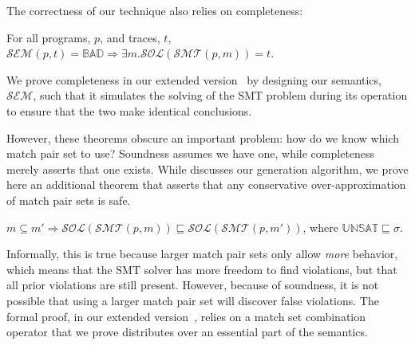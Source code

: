The correctness of our technique also relies on completeness:

\begin{theorem}[Completeness]
For all programs, $p$, and traces, $t$, $\mathcal{SEM}(p, t) =
\mathbb{BAD} \Rightarrow \exists m . \mathcal{SOL}(\mathcal{SMT}(p,
m)) = t$.
\end{theorem}

We prove completeness in our extended version~\cite{extended-version}
by designing our semantics, $\mathcal{SEM}$, such that it simulates
the solving of the SMT problem during its operation to ensure that the
two make identical conclusions.

However, these theorems obscure an important problem: how do we know
which match pair set to use? Soundness assumes we have one, while
completeness merely asserts that one exists. While 
discusses our generation algorithm, we prove here an additional
theorem that asserts that any conservative over-approximation of match
pair sets is safe.

\begin{theorem}[Approximation]
$m \subseteq m' \Rightarrow \mathcal{SOL}(\mathcal{SMT}(p, m))
  \sqsubseteq \mathcal{SOL}(\mathcal{SMT}(p, m'))$, where
  $\mathbb{UNSAT} \sqsubseteq \sigma$.
\end{theorem}

Informally, this is true because larger match pair sets only allow
\emph{more} behavior, which means that the SMT solver has more freedom
to find violations, but that all prior violations are still
present. However, because of soundness, it is not possible that using
a larger match pair set will discover false violations. The formal
proof, in our extended version~\cite{extended-version}, relies on a
match set combination operator that we prove distributes over an
essential part of the semantics.
